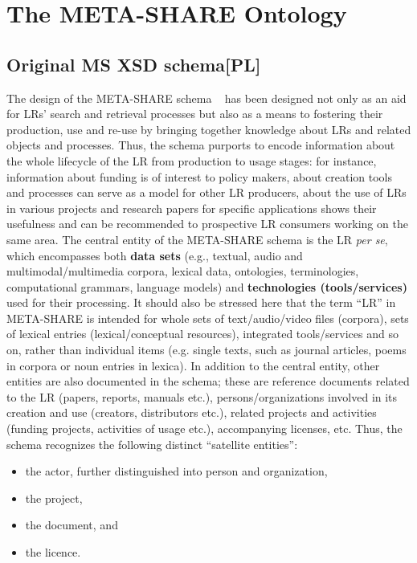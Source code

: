 \documentclass{llncs}
\begin{document}
\section{The META-SHARE Ontology}
\label{sec:ontology}
\subsection{Original MS XSD schema[PL]}
\label{sec:xsd}
The design of the META-SHARE schema ~\cite{gavrilidou2012metashare} has been %
designed not only as an aid for LRs' search and retrieval processes but also as a means to fostering their production, use and re-use by bringing together knowledge about LRs and related objects and processes. Thus, the schema purports to encode information about the whole lifecycle of the LR from production to usage stages: for instance, information about funding is of interest to policy makers, about creation tools and processes can serve as a model for other LR producers, about the use of LRs in various projects and research papers for specific applications shows their usefulness and can be recommended to prospective LR consumers working on the same area.
The central entity of the META-SHARE schema is the LR \textit{per se}, which encompasses
both {\bf data sets} (e.g., textual, audio and multimodal/multimedia corpora, lexical
data, ontologies, terminologies, computational grammars, language models)
and {\bf technologies (tools/services)} used for their processing. It should
also be stressed here that the term ``LR'' in META-SHARE is intended for whole sets of text/audio/video files (corpora), sets of lexical entries (lexical/conceptual resources), integrated tools/services and so on, rather than individual items (e.g. single texts, such as journal articles, poems in corpora or noun entries in lexica).
In addition to the central entity, other entities are also documented in the
schema; these are reference documents related to the LR (papers, reports,
manuals etc.), persons/organizations involved in its creation and use (creators,
distributors etc.), related projects and activities (funding projects,
activities of usage etc.), accompanying licenses, etc. Thus, the schema
recognizes the following distinct ``satellite entities'':
\begin{itemize}
\item the actor, further distinguished into person and organization,
\item the project,
\item the document, and
\item the licence.
\end{itemize}
\end{document}
